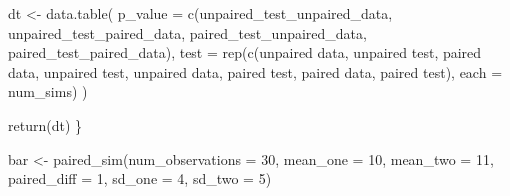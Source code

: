 \documentclass[
  letterpaper,
  DIV=11,
  numbers=noendperiod]{scrreprt}
\newenvironment{Shaded}{\begin{snugshade}}{\end{snugshade}}
\newcommand{\AttributeTok}[1]{\textcolor[rgb]{0.40,0.45,0.13}{#1}}
\newcommand{\DecValTok}[1]{\textcolor[rgb]{0.68,0.00,0.00}{#1}}
\newcommand{\FunctionTok}[1]{\textcolor[rgb]{0.28,0.35,0.67}{#1}}
\newcommand{\NormalTok}[1]{\textcolor[rgb]{0.00,0.23,0.31}{#1}}
\newcommand{\OtherTok}[1]{\textcolor[rgb]{0.00,0.23,0.31}{#1}}
\newcommand{\StringTok}[1]{\textcolor[rgb]{0.13,0.47,0.30}{#1}}
\begin{document}
\begin{Shaded}
\begin{Highlighting}[]
\NormalTok{  dt }\OtherTok{\textless{}{-}} \FunctionTok{data.table}\NormalTok{(}
    \AttributeTok{p\_value =} \FunctionTok{c}\NormalTok{(unpaired\_test\_unpaired\_data, unpaired\_test\_paired\_data, }
\NormalTok{                paired\_test\_unpaired\_data,   paired\_test\_paired\_data), }
    \AttributeTok{test    =} \FunctionTok{rep}\NormalTok{(}\FunctionTok{c}\NormalTok{(}\StringTok{\textquotesingle{}unpaired data, unpaired test\textquotesingle{}}\NormalTok{, }\StringTok{\textquotesingle{}paired data, unpaired test\textquotesingle{}}\NormalTok{, }
                    \StringTok{\textquotesingle{}unpaired data, paired test\textquotesingle{}}\NormalTok{, }\StringTok{\textquotesingle{}paired data, paired test\textquotesingle{}}\NormalTok{), }\AttributeTok{each =}\NormalTok{ num\_sims)}
\NormalTok{  )}
  
  \FunctionTok{return}\NormalTok{(dt)}
\NormalTok{\}}
\end{Highlighting}
\end{Shaded}

\begin{Shaded}
\begin{Highlighting}[]
\NormalTok{bar }\OtherTok{\textless{}{-}} \FunctionTok{paired\_sim}\NormalTok{(}\AttributeTok{num\_observations =} \DecValTok{30}\NormalTok{,  }\AttributeTok{mean\_one =} \DecValTok{10}\NormalTok{, }\AttributeTok{mean\_two =} \DecValTok{11}\NormalTok{, }\AttributeTok{paired\_diff =} \DecValTok{1}\NormalTok{, }\AttributeTok{sd\_one =} \DecValTok{4}\NormalTok{, }\AttributeTok{sd\_two =} \DecValTok{5}\NormalTok{)}
\end{Highlighting}
\end{Shaded}
\end{document}
